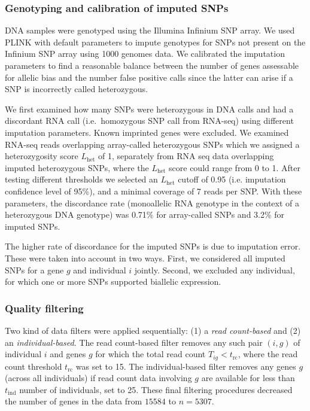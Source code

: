 \documentclass[letterpaper]{article}
\begin{document}
\subsubsection{Genotyping and calibration of imputed SNPs}

DNA samples were genotyped using the Illumina Infinium SNP array. We used
PLINK with default parameters to impute genotypes for SNPs not present on the
Infinium SNP array using 1000 genomes data.  We calibrated the
imputation parameters to find a reasonable balance between the number of genes
assessable for allelic bias and the number false positive
calls since the latter can arise if a SNP is
incorrectly called heterozygous.

We first examined how many SNPs were heterozygous in DNA calls and had a
discordant RNA call (i.e.~homozygous SNP call from RNA-seq) using different imputation
parameters. Known imprinted genes were excluded. We examined RNA-seq reads
overlapping array-called heterozygous SNPs which we assigned a heterozygosity
score \(L_\mathrm{het}\) of 1, separately from RNA seq data
overlapping imputed heterozygous SNPs, where the \(L_\mathrm{het}\) score could
range from 0 to 1.  After testing different thresholds
we selected an \(L_\mathrm{het}\) cutoff of 0.95 (i.e. imputation confidence
level of 95\%), and a minimal coverage of 7 reads per SNP. With these
parameters, the discordance rate (monoallelic RNA genotype in the context of a
heterozygous DNA genotype) was 0.71\% for array-called SNPs and 3.2\% for
imputed SNPs.

The higher rate of discordance for the imputed SNPs
is due to imputation error.  These were taken into
account in two ways.
First, we considered all imputed SNPs for a gene \(g\) and individual \(i\)
jointly.  Second, we excluded
any individual, for which one or more SNPs supported biallelic
expression.


\subsubsection{Quality filtering}

\label{sec:filtering}

Two kind of data filters were applied sequentially: (1) a \emph{read
count-based} and (2) an \emph{individual-based}.  The read count-based filter
removes any such pair $(i,g)$ of individual $i$ and genes $g$ for which the
total read count $T_{ig}<t_\mathrm{rc}$, where the read count threshold
$t_\mathrm{rc}$ was set to 15. The individual-based filter removes any genes
$g$ (across all individuals) if read count data involving $g$ are available
for less than $t_\mathrm{ind}$ number of individuals, set to 25.
These final filtering procedures decreased the number of genes in the data from
\(15584\) to \(n=5307\).
\end{document}

